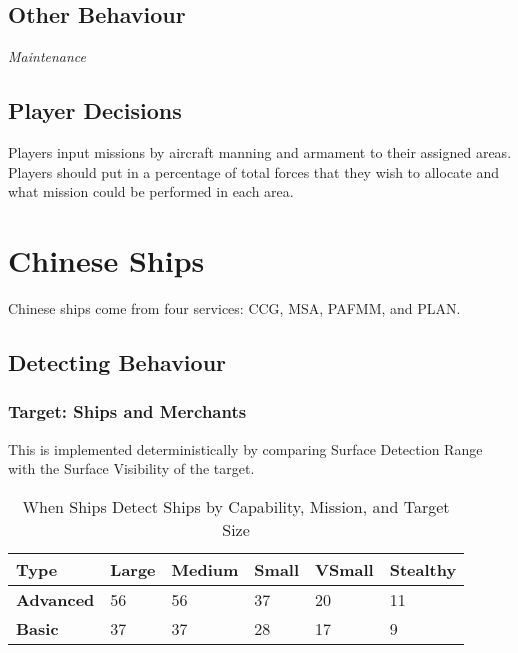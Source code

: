 \documentclass{article}
\begin{document}
\subsection{Other Behaviour}
        \noindent \textit{Maintenance} \\
        
\subsection{Player Decisions}
    Players input missions by aircraft manning and armament to their assigned areas. Players should put in a percentage of total forces that they wish to allocate and what mission could be performed in each area.

\section{Chinese Ships}

Chinese ships come from four services: CCG, MSA, PAFMM, and PLAN. \\

\subsection{Detecting Behaviour}

     \subsubsection{Target: Ships and Merchants}
            \par \noindent This is implemented deterministically by comparing Surface Detection Range with the Surface Visibility of the target.
            \begin{table}[H]
                \centering
                \begin{tabularx}{\textwidth}{|l|X|X|X|X|X|}
                    \hline
                    \textbf{Type} & \textbf{Large} & \textbf{Medium} & \textbf{Small} & \textbf{VSmall} & \textbf{Stealthy} \\
                    \hline
                    \textbf{Advanced} & 56 & 56 & 37 & 20 & 11 \\
                    \hline
                    \textbf{Basic} & 37 & 37 & 28 & 17 & 9 \\
                    \hline
                \end{tabularx}
                \caption{When Ships Detect Ships by Capability, Mission, and Target Size}
                \label{table:ChineseShipDetectionofShips}
            \end{table}
\end{document}
